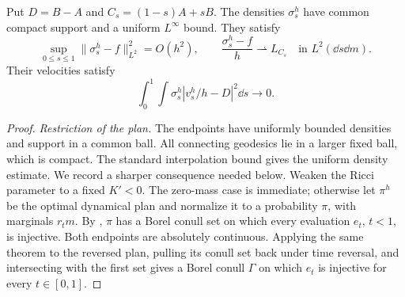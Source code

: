 \begin{lemma}
\label{fwd:density}
Put \(D=B-A\) and \(C_s=(1-s)A+sB\). The densities \(\sigma^h_s\)
have common compact support and a uniform \(L^\infty\) bound. They
satisfy
\begin{equation}
\label{fwd:density-bound}
 \sup_{0\leq s\leq1}\|\sigma^h_s-f\|_{L^2}^2=O(h^2),
 \qquad
 \frac{\sigma^h_s-f}{h}\rightharpoonup L_{C_s}
 \quad\text{in }L^2(\dd s\dd m).
\end{equation}
Their velocities satisfy
\begin{equation}
\label{fwd:velocity-first}
 \int_0^1\int\sigma^h_s|v^h_s/h-D|^2\dd s\longrightarrow0.
\end{equation}
\end{lemma}

\begin{proof}
\emph{Restriction of the plan.}
The endpoints have uniformly bounded densities and support in a
common ball. All connecting geodesics lie in a larger fixed ball,
which is compact. The standard interpolation bound gives the uniform
density estimate. We record a sharper consequence needed below.
Weaken the Ricci parameter to a fixed \(K'<0\). The zero-mass case
is immediate; otherwise let \(\pi^h\) be the optimal dynamical
plan and normalize it to a probability \(\pi\), with marginals
\(r_t m\). By
\cite[Theorem~1.1]{GigliRajalaSturm2016}, \(\pi\) has a Borel
conull set on which every evaluation \(e_t\), \(t<1\), is
injective. Both endpoints are absolutely continuous. Applying the
same theorem to the reversed plan, pulling its conull set back
under time reversal, and intersecting with the first set gives a
Borel conull \(\Gamma\) on which \(e_t\) is
injective for every \(t\in[0,1]\).


\end{proof}

